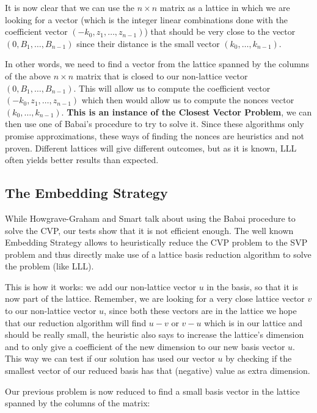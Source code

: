 \documentclass[a4paper,11pt]{article}
\begin{document}
It is now clear that we can use the $n \times n$ matrix as a lattice in which we are looking for a vector (which is the integer linear combinations done with the coefficient vector $(-k_0, z_1, \hdots, z_{n-1})$) that should be very close to the vector $(0, B_1 , \hdots, B_{n-1})$ since their distance is the small vector $(k_0, \hdots, k_{n-1})$.

In other words, we need to find a vector from the lattice spanned by the columns of the above $n \times n$ matrix that is closed to our non-lattice vector $(0, B_1 , \hdots, B_{n-1})$. This will allow us to compute the coefficient vector $(-k_0, z_1, \hdots, z_{n-1})$ which then would allow us to compute the nonces vector $(k_0, \hdots, k_{n-1})$. \textbf{This is an instance of the Closest Vector Problem}, we can then use one of Babai's procedure to try to solve it. Since these algorithms only promise approximations, these ways of finding the nonces are heuristics and not proven. Different lattices will give different outcomes, but as it is known, LLL often yields better results than expected.

\subsection{The Embedding Strategy}

While Howgrave-Graham and Smart talk about using the Babai procedure to solve the CVP, our tests show that it is not efficient enough. The well known Embedding Strategy allows to heuristically reduce the CVP problem to the SVP problem and thus directly make use of a lattice basis reduction algorithm to solve the problem (like LLL).

This is how it works: we add our non-lattice vector $u$ in the basis, so that it is now part of the lattice. Remember, we are looking for a very close lattice vector $v$ to our non-lattice vector $u$, since both these vectors are in the lattice we hope that our reduction algorithm will find $u - v$ or $v - u$ which is in our lattice and should be really small, the heuristic also says to increase the lattice's dimension and to only give a coefficient of the new dimension to our new basis vector $u$. This way we can test if our solution has used our vector $u$ by checking if the smallest vector of our reduced basis has that (negative) value as extra dimension.

Our previous problem is now reduced to find a small basis vector in the lattice spanned by the columns of the matrix:
\end{document}
